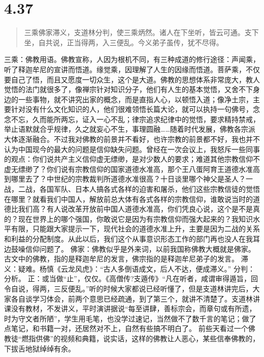 \documentclass[]{book}
\begin{document}
\section{4.37}\label{section-215}

\begin{quote}
三乘佛家滞义，支道林分判，使三乘炳然。诸人在下坐听，皆云可通。支下坐，自共说，正当得两，入三便乱。今义弟子虽传，犹不尽得。
\end{quote}

三乘：佛教用语。佛教宣称，人因为根机不同，有三种成道的修行途径：声闻乘，听了释迦牟尼的宣讲而悟道。缘觉乘，因理解了人生的因缘而悟道。菩萨乘，不仅要自己了悟，而且又愿度一切众生，这个是大道。佛教的思想体系非常庞大，教人觉悟的法门就很多了，像禅宗针对知识分子，他们有人生的基本觉悟，又舍不下身边的一些事物，就不讲究出家的概念，而是直指人心，以顿悟入道；像净土宗，主要针对没有什么文化知识的人，他们很难领悟长篇大论，就可以执持一句佛号，念念不忘，久而能所两忘，证入一心不乱；律宗追求纪律中的觉悟，要求精持禁戒，举止语默就合乎规律，久之就妄心不生，事理圆融\ldots{}\ldots{}随着时代发展，佛教各宗派大体逐渐融合。不过我对佛教的前景并不看好，也许宗教的前景都不好，我也并不认为中国现今的最大的问题是信仰缺失问题。曾经在一次会议上，我怒斥一些同事的观点：你们说共产主义信仰虚无缥缈，是对少数人的要求；难道其他宗教信仰不虚无缥缈了？你们说有宗教信仰的国家道德水准高，那个王八蛋阿育王道德水准高到哪里去了？中世纪的宗教裁判所道德水准很高？十日谈里哪个神父是圣人？一战，二战，各国军队、日本人搞各式各样的迫害和屠杀，他们这些宗教信徒的觉悟在哪里？就看我们中国人，解放前总大体有各式各样的宗教信仰，谁敢说当时的道德比我们高？有人说改革开放前中国人道德水准高，你们凭良心说，这个是不是真的？现在世界上的哪个强国，你敢说它是因为有宗教信仰而强大起来的？我知识水平有限，只能跟大家提示一下，现代社会的道德水准上升，主要是因为二战的关系和利益的分配制度。从此以后，我们这个从事意识形态工作的部门再也没人在我耳边鼓噪信仰问题了。
佛家：佛教似乎是外来词，以前我国称佛教大概就是佛家。古文中的佛教，指的是释迦牟尼的发言，佛宗指的是释迦牟尼弟子的发言。
滞义：疑难。杨慎《云龙风虎》：``古人多倒语成文，后人不达，便成滞义。''
分判：分析。
正：或当做``止''，仅仅。《高僧传?支遁传》``凡在听者，咸谓审得遁旨，回令自说，得两，三反便乱。''听的时候大家都说已经听懂了，但是支道林讲完后，大家各自谈学习体会，前两个意思已经疏通，到了第三个，就讲不清楚了。支道林讲课没有教材，不发讲义，平时演讲据说``每至讲肆，善标宗会，而章句或有所遗，时为守文者所陋''，学生用毛笔，也没学过速记，当然做不了数千言的笔记；做了点笔记，和书籍一对，还居然对不上，自然有些搞不明白了。
前些天看过一个佛教徒``燃指供佛''的视频和典籍，说实话，这样的佛教让人恶心，某些信奉佛教的，下拔舌地狱绰绰有余。
\end{document}
